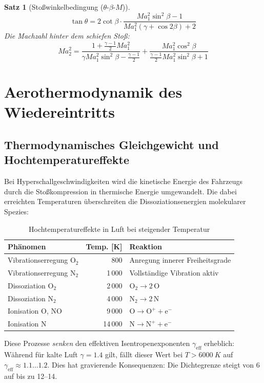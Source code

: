 ﻿\documentclass[12pt,a4paper]{article}
\newtheorem{satz}{Satz}[section]
\newcommand{\Ma}{M\!a}
\begin{document}
\begin{satz}[Stoßwinkelbedingung ($\theta$-$\beta$-$M$)]
\[
  \tan\theta = 2\cot\beta\cdot
    \frac{\Ma_1^2\sin^2\beta - 1}{\Ma_1^2(\gamma + \cos 2\beta) + 2}
\]
Die Machzahl hinter dem schiefen Stoß:
\[
  \Ma_2^2 = \frac{1 + \frac{\gamma-1}{2}\Ma_1^2}
    {\gamma\Ma_1^2\sin^2\beta - \frac{\gamma-1}{2}}
    + \frac{\Ma_1^2\cos^2\beta}
    {\frac{\gamma-1}{2}\Ma_1^2\sin^2\beta + 1}
\]
\end{satz}

\section{Aerothermodynamik des Wiedereintritts}

\subsection{Thermodynamisches Gleichgewicht und Hochtemperatureffekte}

Bei Hyperschallgeschwindigkeiten wird die kinetische Energie des Fahrzeugs durch
die Stoßkompression in thermische Energie umgewandelt. Die dabei erreichten
Temperaturen überschreiten die Dissoziationsenergien molekularer Spezies:

\begin{table}[H]
\centering
\caption{Hochtemperatureffekte in Luft bei steigender Temperatur}
\label{tab:hochtemp}
\begin{tabular}{lrl}
\toprule
\textbf{Phänomen} & \textbf{Temp. [K]} & \textbf{Reaktion}\\
\midrule
Vibrationserregung O$_2$        & 800    & Anregung innerer Freiheitsgrade\\
Vibrationserregung N$_2$        & 1\,000 & Vollständige Vibration aktiv\\
Dissoziation O$_2$              & 2\,000 & $\mathrm{O_2 \to 2\,O}$\\
Dissoziation N$_2$              & 4\,000 & $\mathrm{N_2 \to 2\,N}$\\
Ionisation O, NO                & 9\,000 & $\mathrm{O \to O^+ + e^-}$\\
Ionisation N                    & 14\,000& $\mathrm{N \to N^+ + e^-}$\\
\bottomrule
\end{tabular}
\end{table}

Diese Prozesse \emph{senken} den effektiven Isentropenexponenten $\gamma_{\text{eff}}$
erheblich: Während für kalte Luft $\gamma = 1.4$ gilt, fällt dieser Wert bei
$T > \SI{6000}{K}$ auf $\gamma_{\text{eff}} \approx 1.1\ldots1.2$. Dies hat
gravierende Konsequenzen: Die Dichtegrenze steigt von 6 auf bis zu 12--14.
\end{document}

